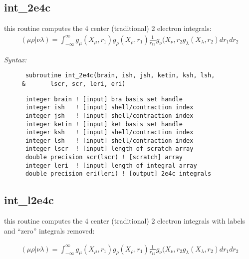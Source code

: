 \subsection{int\_2e4c} 
this routine computes the 4 center (traditional) 2 electron integrals:  
\begin{eqnarray*} 
({\mu}{\rho}|{\nu}{\lambda}) = \int_{-\infty}^{\infty} g_{\mu}(X_{\mu},r_{1})g_{\rho}(X_{\rho},r_{1})\frac{1}{r_{12}}g_{\nu}
(X_{\nu},r_{2}g_{\lambda}(X_{\lambda},r_{2})dr_{1}dr_{2} 
\end{eqnarray*} 
 
{\it Syntax:} 
\begin{verbatim} 
      subroutine int_2e4c(brain, ish, jsh, ketin, ksh, lsh, 
     &       lscr, scr, leri, eri) 
\end{verbatim} 
\begin{verbatim} 
      integer brain ! [input] bra basis set handle 
      integer ish   ! [input] shell/contraction index 
      integer jsh   ! [input] shell/contraction index 
      integer ketin ! [input] ket basis set handle 
      integer ksh   ! [input] shell/contraction index 
      integer lsh   ! [input] shell/contraction index 
      integer lscr  ! [input] length of scratch array 
      double precision scr(lscr) ! [scratch] array 
      integer leri  ! [input] length of integral array 
      double precision eri(leri) ! [output] 2e4c integrals 
\end{verbatim} 
\subsection{int\_l2e4c} 
this routine computes the 4 center (traditional) 2 electron integrals 
with labels and ``zero'' integrals removed:  
 
\begin{eqnarray*} 
({\mu}{\rho}|{\nu}{\lambda}) = \int_{-\infty}^{\infty} g_{\mu}(X_{\mu},r_{1})g_{\rho}(X_{\rho},r_{1})\frac{1}{r_{12}}g_{\nu}
(X_{\nu},r_{2}g_{\lambda}(X_{\lambda},r_{2})dr_{1}dr_{2} 
\end{eqnarray*} 
 
